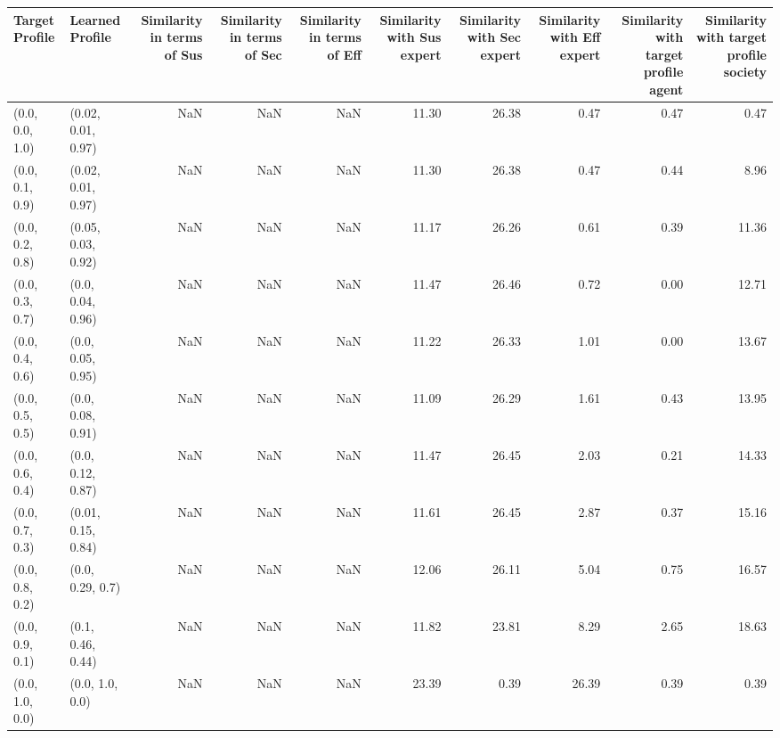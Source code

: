 \begin{tabular}{llrrrrrrrr}
\toprule
Target Profile & Learned Profile & Similarity in terms of Sus & Similarity in terms of Sec & Similarity in terms of Eff & Similarity with Sus expert & Similarity with Sec expert & Similarity with Eff expert & Similarity with target profile agent & Similarity with target profile society \\
\midrule
(0.0, 0.0, 1.0) & (0.02, 0.01, 0.97) & NaN & NaN & NaN & 11.30 & 26.38 & 0.47 & 0.47 & 0.47 \\
(0.0, 0.1, 0.9) & (0.02, 0.01, 0.97) & NaN & NaN & NaN & 11.30 & 26.38 & 0.47 & 0.44 & 8.96 \\
(0.0, 0.2, 0.8) & (0.05, 0.03, 0.92) & NaN & NaN & NaN & 11.17 & 26.26 & 0.61 & 0.39 & 11.36 \\
(0.0, 0.3, 0.7) & (0.0, 0.04, 0.96) & NaN & NaN & NaN & 11.47 & 26.46 & 0.72 & 0.00 & 12.71 \\
(0.0, 0.4, 0.6) & (0.0, 0.05, 0.95) & NaN & NaN & NaN & 11.22 & 26.33 & 1.01 & 0.00 & 13.67 \\
(0.0, 0.5, 0.5) & (0.0, 0.08, 0.91) & NaN & NaN & NaN & 11.09 & 26.29 & 1.61 & 0.43 & 13.95 \\
(0.0, 0.6, 0.4) & (0.0, 0.12, 0.87) & NaN & NaN & NaN & 11.47 & 26.45 & 2.03 & 0.21 & 14.33 \\
(0.0, 0.7, 0.3) & (0.01, 0.15, 0.84) & NaN & NaN & NaN & 11.61 & 26.45 & 2.87 & 0.37 & 15.16 \\
(0.0, 0.8, 0.2) & (0.0, 0.29, 0.7) & NaN & NaN & NaN & 12.06 & 26.11 & 5.04 & 0.75 & 16.57 \\
(0.0, 0.9, 0.1) & (0.1, 0.46, 0.44) & NaN & NaN & NaN & 11.82 & 23.81 & 8.29 & 2.65 & 18.63 \\
(0.0, 1.0, 0.0) & (0.0, 1.0, 0.0) & NaN & NaN & NaN & 23.39 & 0.39 & 26.39 & 0.39 & 0.39 \\
\bottomrule
\end{tabular}
